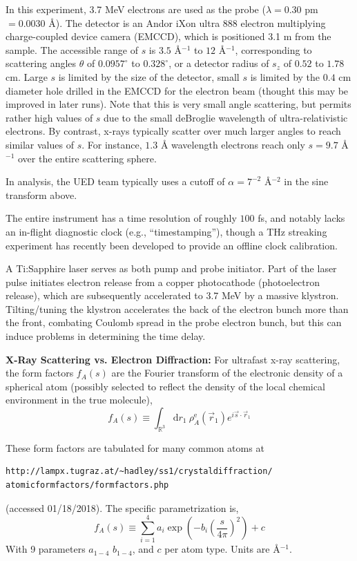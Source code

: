\documentclass[fleqn,oneside,12pt]{article}
\begin{document}
In this experiment, 3.7 MeV electrons are used as the probe ($\lambda = 0.30$ pm
$= 0.0030$ \AA{}). The detector is an Andor iXon ultra 888 electron multiplying
charge-coupled device camera (EMCCD), which is positioned 3.1 m from the sample.
The accessible range of $s$ is $3.5$ \AA{}$^{-1}$ to $12$ \AA{}$^{-1}$,
corresponding to scattering angles $\theta$ of $0.0957^{\circ}$ to
$0.328^{\circ}$, or a detector radius of $s_{z}$ of $0.52$ to $1.78$ cm. Large
$s$ is limited by the size of the detector, small $s$ is limited by the $0.4$ cm
diameter hole drilled in the EMCCD for the electron beam (thought this may be
improved in later runs). Note that this is very small angle scattering, but
permits rather high values of $s$ due to the small deBroglie wavelength of
ultra-relativistic electrons. By contrast, x-rays typically scatter over much
larger angles to reach similar values of $s$. For instance, $1.3$ \AA{}
wavelength electrons reach only $s = 9.7$ \AA{}$^{-1}$ over the entire
scattering sphere.

In analysis, the UED team typically uses a cutoff of $\alpha = 7^{-2}$
\AA{}$^{-2}$ in the sine transform above. 

The entire instrument has a time resolution of roughly $100$ fs, and notably
lacks an in-flight diagnostic clock (e.g., ``timestamping''), though a THz
streaking experiment has recently been developed to provide an offline clock
calibration. 

A Ti:Sapphire laser serves as both pump and probe initiator. Part of the laser
pulse initiates electron release from a copper photocathode (photoelectron
release), which are subsequently accelerated to 3.7 MeV by a massive klystron.
Tilting/tuning the klystron accelerates the back of the electron bunch more than
the front, combating Coulomb spread in the probe electron bunch, but this can
induce problems in determining the time delay. 

\textbf{X-Ray Scattering vs. Electron Diffraction:} For ultrafast x-ray
scattering, the form factors $f_{A} (s)$ are the Fourier transform of the
electronic density of a spherical atom (possibly selected to reflect the density
of the local chemical environment in the true molecule),
\[
f_{A} (s)
\equiv
\int_{\mathbb{R}^3}
\mathrm{d} r_1
\
\rho_{A}^{\mathrm{e}} (\vec r_{1})
e^{i \vec s \cdot \vec r_1}
\]

These form factors are tabulated for many common atoms at
\begin{verbatim}
http://lampx.tugraz.at/~hadley/ss1/crystaldiffraction/
atomicformfactors/formfactors.php
\end{verbatim}
(accessed 01/18/2018). The specific parametrization is,
\[
f_{A} (s)
\equiv
\sum_{i=1}^{4}
a_{i}
\exp
\left (
-b_{i}
\left (
\frac{s}{4\pi}
\right )^2
\right )
+
c
\]
With 9 parameters $a_{1-4}$ $b_{1-4}$, and $c$ per atom type. Units are
\AA{}$^{-1}$.
\end{document}
